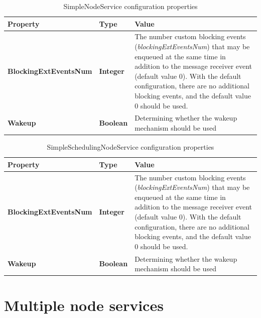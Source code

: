 \begin{table}
\scriptsize
\begin{center}
\begin{tabular}{p{3.5cm} p{1.5cm} p{9.5cm}}
	\hline
	\textbf{Property}							& \textbf{Type}						& \textbf{Value}					\\[1mm]
    \hline
	\textbf{BlockingExtEventsNum}				& \textbf{Integer}					& The number custom blocking events (\emph{blockingExtEventsNum}) that may be enqueued at the same time in addition to the message receiver event (default value 0). With the default configuration, there are no additional blocking events, and the default value 0 should be used.		\\[1.5mm]	
	\textbf{Wakeup}								& \textbf{Boolean}					& Determining whether the wakeup mechanism should be used						\\[1.5mm]	
    \hline
\end{tabular}
\end{center}
\caption{SimpleNodeService configuration properties}
\label{tab:libSimpleNodeService}
\end{table}


\begin{table}
\scriptsize
\begin{center}
\begin{tabular}{p{3.5cm} p{1.5cm} p{9.5cm}}
	\hline
	\textbf{Property}							& \textbf{Type}						& \textbf{Value}					\\[1mm]
    \hline
	\textbf{BlockingExtEventsNum}				& \textbf{Integer}					& The number custom blocking events (\emph{blockingExtEventsNum}) that may be enqueued at the same time in addition to the message receiver event (default value 0). With the default configuration, there are no additional blocking events, and the default value 0 should be used.		\\[1.5mm]	
	\textbf{Wakeup}								& \textbf{Boolean}					& Determining whether the wakeup mechanism should be used						\\[1.5mm]	
    \hline
\end{tabular}
\end{center}
\caption{SimpleSchedulingNodeService configuration properties}
\label{tab:libSimpleSchedulingNodeService}
\end{table}




\section{Multiple node services}	
\label{sec:libMultipleNodeServices}

